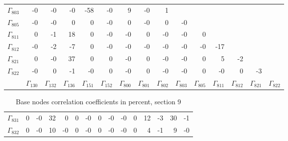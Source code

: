 {\begin{table}
\begin{center}
\begin{minipage}{\linewidth}
\begin{center}
\begin{envsmall}
\begin{center}
\begin{tabular}{rrrrrrrrrrrrrrr}
\( \Gamma_{803} \) &   -0 &   -0 &   -0 &  -58 &   -0 &    9 &   -0 &    1 &  &  &  &  &  &  \\
\( \Gamma_{805} \) &   -0 &   -0 &    0 &    0 &   -0 &    0 &   -0 &    0 &   -0 &  &  &  &  &  \\
\( \Gamma_{811} \) &    0 &   -1 &   18 &    0 &   -0 &   -0 &    0 &   -0 &   -0 &    0 &  &  &  &  \\
\( \Gamma_{812} \) &   -0 &   -2 &   -7 &    0 &   -0 &   -0 &   -0 &   -0 &   -0 &   -0 &  -17 &  &  &  \\
\( \Gamma_{821} \) &    0 &   -0 &   37 &    0 &    0 &   -0 &    0 &   -0 &   -0 &    0 &    5 &   -2 &  &  \\
\( \Gamma_{822} \) &   -0 &    0 &   -1 &   -0 &    0 &   -0 &    0 &   -0 &   -0 &    0 &   -0 &    0 &   -3 &  \\
 & \( \Gamma_{130} \) & \( \Gamma_{132} \) & \( \Gamma_{136} \) & \( \Gamma_{151} \) & \( \Gamma_{152} \) & \( \Gamma_{800} \) & \( \Gamma_{801} \) & \( \Gamma_{802} \) & \( \Gamma_{803} \) & \( \Gamma_{805} \) & \( \Gamma_{811} \) & \( \Gamma_{812} \) & \( \Gamma_{821} \) & \( \Gamma_{822} \)
\\\hline
\end{tabular}
\end{center}
\end{envsmall}
\ifhevea\else
\end{center}
\end{minipage}
\fi
\end{center}
\ifhevea\end{table}\fi
\ifhevea\begin{table}\fi%
\begin{center}
\ifhevea
\caption{Base nodes correlation coefficients in percent, section 9\label{tab:br-fit-corr9}}%
\else
\begin{minipage}{\linewidth}
\begin{center}
\label{tab:br-fit-corr9}%
\fi
\begin{envsmall}
\begin{center}
\renewcommand*{\arraystretch}{1.1}%
\begin{tabular}{rrrrrrrrrrrrrrr}
\hline
\( \Gamma_{831} \) &    0 &   -0 &   32 &    0 &    0 &   -0 &    0 &   -0 &   -0 &    0 &   12 &   -3 &   30 &   -1 \\
\( \Gamma_{832} \) &    0 &   -0 &   10 &   -0 &    0 &   -0 &    0 &   -0 &   -0 &    0 &    4 &   -1 &    9 &   -0 \\

\end{tabular}
\end{center}
\end{envsmall}
\end{center}
\end{minipage}
\end{center}
\end{table}}
